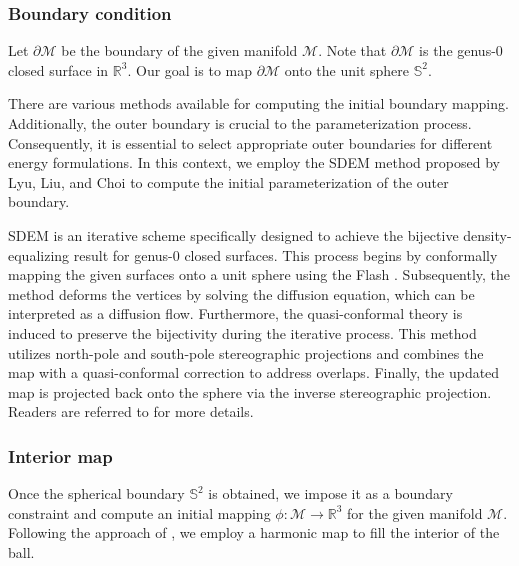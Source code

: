 \documentclass{article}
\begin{document}
\subsubsection{Boundary condition}\label{ssec:boundary_map}
Let $\partial \mathcal{M}$ be the boundary of the given manifold $\mathcal{M}$. Note that $\partial \mathcal{M}$ is the genus-0 closed surface in $\mathbb R^3$. Our goal is to map $\partial \mathcal{M}$ onto the unit sphere $\mathbb S^2$. 

There are various methods available for computing the initial boundary mapping. Additionally, the outer boundary is crucial to the parameterization process. Consequently, it is essential to select appropriate outer boundaries for different energy formulations. In this context, we employ the SDEM method proposed by Lyu, Liu, and Choi \cite{lyu2024spherical} to compute the initial parameterization of the outer boundary. 




SDEM is an iterative scheme specifically designed to achieve the bijective density-equalizing result for genus-0 closed surfaces. This process begins by conformally mapping the given surfaces onto a unit sphere using the Flash \cite{choi2015flash}. Subsequently, the method deforms the vertices by solving the diffusion equation, which can be interpreted as a diffusion flow. Furthermore, the quasi-conformal theory is induced to preserve the bijectivity during the iterative process. This method utilizes north-pole and south-pole stereographic projections and combines the map with a quasi-conformal correction to address overlaps. Finally, the updated map is projected back onto the sphere via the inverse stereographic projection. Readers are referred to \cite{lyu2024spherical} for more details.




\subsubsection{Interior map}\label{ssec:interior_harmonic}
Once the spherical boundary $\mathbb{S}^2$ is obtained, we impose it as a boundary constraint and compute an initial mapping $\phi \colon \mathcal{M} \to \mathbb{R}^3$ for the given manifold $\mathcal{M}$. Following the approach of \cite{wang2003volumetric}, we employ a harmonic map to fill the interior of the ball.
\end{document}

